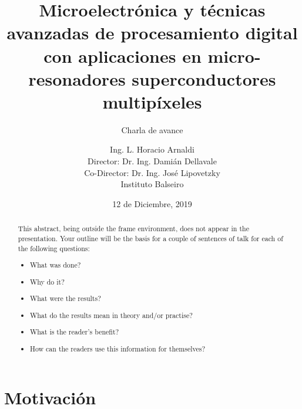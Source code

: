\documentclass[ignorenonframetext,12pt]{beamer}
\title{Microelectrónica y técnicas avanzadas de procesamiento digital con
aplicaciones en micro-resonadores superconductores multipíxeles}
\subtitle{\alert{Charla de avance}}
\author{Ing. L. Horacio Arnaldi\\
\vspace{0.4cm}
Director: Dr. Ing. Damián Dellavale\\
Co-Director: Dr. Ing. José Lipovetzky\\
\vspace{0.6cm}
Instituto Balseiro}
\date{12 de Diciembre, 2019}
\begin{document}
\begin{frame}
	\maketitle
\end{frame}

\begin{abstract}
	This abstract, being outside the frame environment, does not appear in
	the presentation.  Your outline will be the basis for a couple of
	sentences of talk for each of the following questions:
	\begin{itemize}
		\item What was done?
		\item Why do it?
		\item What were the results?
		\item What do the results mean in theory and/or practise?
		\item What is the reader's benefit?
		\item How can the readers use this information for themselves? 
	\end{itemize}
\end{abstract}


\section{Motivación}
\end{document}
